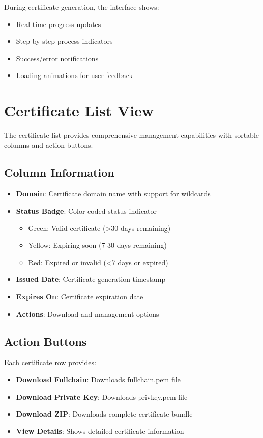 During certificate generation, the interface shows:
\begin{itemize}
    \item Real-time progress updates
    \item Step-by-step process indicators
    \item Success/error notifications
    \item Loading animations for user feedback
\end{itemize}

\section{Certificate List View}

The certificate list provides comprehensive management capabilities with sortable columns and action buttons.

\subsection{Column Information}

\begin{itemize}
    \item \textbf{Domain}: Certificate domain name with support for wildcards
    \item \textbf{Status Badge}: Color-coded status indicator
    \begin{itemize}
        \item Green: Valid certificate (>30 days remaining)
        \item Yellow: Expiring soon (7-30 days remaining)
        \item Red: Expired or invalid (<7 days or expired)
    \end{itemize}
    \item \textbf{Issued Date}: Certificate generation timestamp
    \item \textbf{Expires On}: Certificate expiration date
    \item \textbf{Actions}: Download and management options
\end{itemize}

\subsection{Action Buttons}

Each certificate row provides:
\begin{itemize}
    \item \textbf{Download Fullchain}: Downloads fullchain.pem file
    \item \textbf{Download Private Key}: Downloads privkey.pem file
    \item \textbf{Download ZIP}: Downloads complete certificate bundle
    \item \textbf{View Details}: Shows detailed certificate information
\end{itemize}

